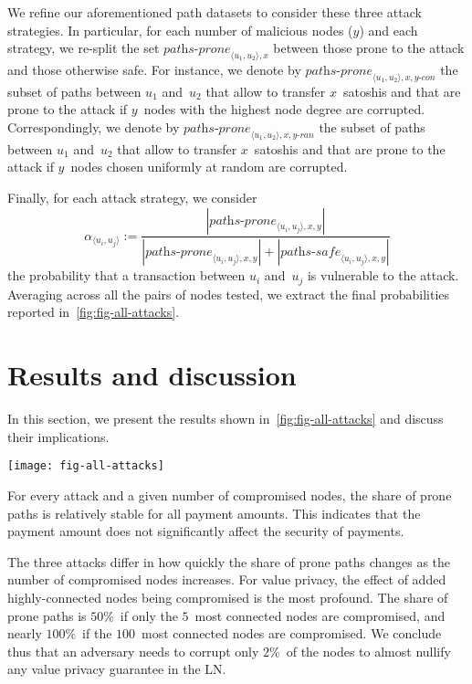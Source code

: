 We refine our aforementioned path datasets to consider these three attack strategies.
In particular, for each number of malicious nodes ($y$) and each strategy, we re-split the set $\textit{paths-prone}_{\langle u_1, u_2 \rangle, x}$ between those prone to the attack and those otherwise safe.
For instance, we denote by $\textit{paths-prone}_{\langle u_1, u_2 \rangle, x, y\textit{-con}}$ the subset of paths between $u_1$ and~$u_2$ that allow to transfer $x$~satoshis and that are prone to the attack if $y$~nodes with the highest node degree are corrupted.
Correspondingly, we denote by $\textit{paths-prone}_{\langle u_1, u_2 \rangle, x, y\textit{-ran}}$ the subset of paths between $u_1$ and~$u_2$ that allow to transfer $x$~satoshis and that are prone to the attack if $y$~nodes chosen uniformly at random are corrupted.

Finally, for each attack strategy, we consider $$\alpha_{\langle u_i, u_j \rangle} := \frac{|\textit{paths-prone}_{\langle u_i, u_j \rangle, x, y}|}{|\textit{paths-prone}_{\langle u_i, u_j \rangle, x, y}| + |\textit{paths-safe}_{\langle u_i, u_j \rangle, x, y}|}$$ the probability that a transaction between $u_i$ and~$u_j$ is vulnerable to the attack.
Averaging across all the pairs of nodes tested, we extract the final probabilities reported in~\cref{fig:fig-all-attacks}.

\section{Results and discussion}

In this section, we present the results shown in~\cref{fig:fig-all-attacks} and discuss their implications.
\begin{figure*}
	\centering
	\texttt{[image: fig-all-attacks]}
	\caption{Share of prone paths for each parameter combination.}
	\label{fig:fig-all-attacks}
\end{figure*}

For every attack and a given number of compromised nodes, the share of prone paths is relatively stable for all payment amounts.
This indicates that the payment amount does not significantly affect the security of payments.

The three attacks differ in how quickly the share of prone paths changes as the number of compromised nodes increases.
For value privacy, the effect of added highly-connected nodes being compromised is the most profound.
The share of prone paths is $50\%$~if only the $5$~most connected nodes are compromised, and nearly $100\%$~if the $100$~most connected nodes are compromised.
We conclude thus that an adversary needs to corrupt only $2\%$~of the nodes to almost nullify any value privacy guarantee in the LN\@.

